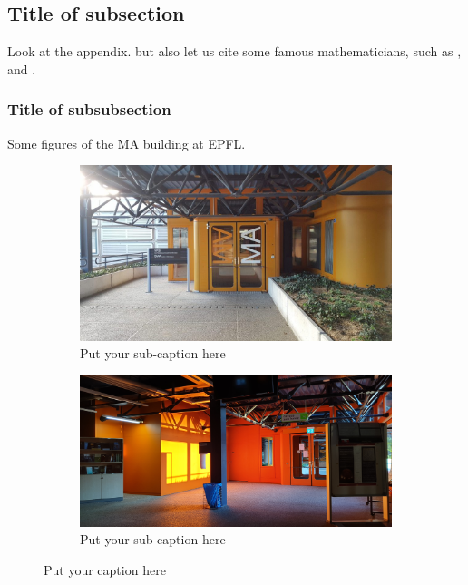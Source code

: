 \documentclass{article}
\begin{document}
\subsection{Title of subsection}

Look at the appendix. but also let us cite some famous mathematicians, such as  \cite{Eul1795}, \cite{Fisher:1950} and \cite{Mir06}.

\subsubsection{Title of subsubsection}

Some figures of the MA building at EPFL. 

\begin{figure}[h]
	\begin{center}
	\begin{subfigure}[b]{.4\textwidth}
		\includegraphics[width=.8\linewidth]{exterieur}  
		\caption{Put your sub-caption here}
		\label{fig:sub-first}
	\end{subfigure}
	\begin{subfigure}[b]{.4\textwidth}
		\includegraphics[width=.8\linewidth]{interieur}  
		\caption{Put your sub-caption here}
		\label{fig:sub-second}
	\end{subfigure}
	\caption{Put your caption here}
	\label{fig:fig}
\end{center}
\end{figure}
\end{document}
